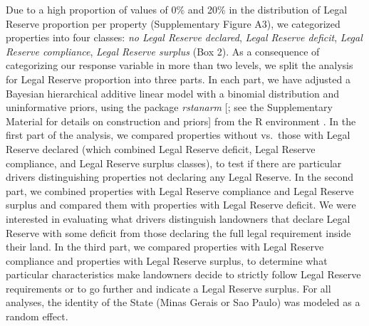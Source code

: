 \documentclass[
	12pt,				%
	oneside,			%
	a4paper,			%
	chapter=TITLE,		%
	section=TITLE,		%
	brazil,			%
	english				%
	]{abntex2}
\begin{document}
Due to a high proportion of values of 0\% and 20\% in the distribution of Legal Reserve proportion per property (Supplementary Figure A3), we categorized properties into four classes: \emph{no Legal Reserve declared}, \emph{Legal Reserve deficit}, \emph{Legal Reserve compliance}, \emph{Legal Reserve surplus} (Box 2). As a consequence of categorizing our response variable in more than two levels, we split the analysis for Legal Reserve proportion into three parts. In each part, we have adjusted a Bayesian hierarchical additive linear model with a binomial distribution and uninformative priors, using the package \emph{rstanarm} {[}\textcite{gabry_rstanarm_2018}; see the Supplementary Material for details on construction and priors{]} from the R environment \autocite{team_r_2018}. In the first part of the analysis, we compared properties without vs.~those with Legal Reserve declared (which combined Legal Reserve deficit, Legal Reserve compliance, and Legal Reserve surplus classes), to test if there are particular drivers distinguishing properties not declaring any Legal Reserve. In the second part, we combined properties with Legal Reserve compliance and Legal Reserve surplus and compared them with properties with Legal Reserve deficit. We were interested in evaluating what drivers distinguish landowners that declare Legal Reserve with some deficit from those declaring the full legal requirement inside their land. In the third part, we compared properties with Legal Reserve compliance and properties with Legal Reserve surplus, to determine what particular characteristics make landowners decide to strictly follow Legal Reserve requirements or to go further and indicate a Legal Reserve surplus. For all analyses, the identity of the State (Minas Gerais or Sao Paulo) was modeled as a random effect.
\end{document}
